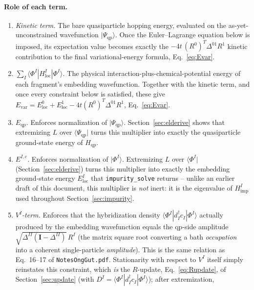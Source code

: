 \documentclass[11pt]{article}
\newcommand{\Hqp}{H_{\mathrm{qp}}}
\newcommand{\Himp}{H_{\mathrm{imp}}}
\newcommand{\Hloc}{H_{\mathrm{loc}}}
\begin{document}
\paragraph{Role of each term.}
\begin{enumerate}
  \item \emph{Kinetic term.} The bare quasiparticle hopping energy,
    evaluated on the as-yet-unconstrained wavefunction
    $|\Psi_{\mathrm{qp}}\rangle$. Once the Euler--Lagrange equation below is
    imposed, its expectation value becomes exactly the
    $-4t\,(R^0)^T\Delta^{01}R^1$ kinetic contribution to the final
    variational-energy formula, Eq.~\eqref{eq:Evar}.
  \item \emph{$\sum_I\langle\Phi^I|\Hloc^I|\Phi^I\rangle$.} The physical
    interaction-plus-chemical-potential energy of each fragment's embedding
    wavefunction. Together with the kinetic term, and once every constraint
    below is satisfied, these give
    $E_{\mathrm{var}}=E^0_{\mathrm{loc}}+E^1_{\mathrm{loc}}-4t(R^0)^T\Delta^{01}R^1$,
    Eq.~\eqref{eq:Evar}.
  \item \emph{$E_{\mathrm{qp}}$.} Enforces normalization of
    $|\Psi_{\mathrm{qp}}\rangle$. Section~\ref{sec:elderive} shows that
    extremizing $L$ over $\langle\Psi_{\mathrm{qp}}|$ turns this multiplier
    into exactly the quasiparticle ground-state energy of $\Hqp$.
  \item \emph{$E^{I,c}$.} Enforces normalization of $|\Phi^I\rangle$.
    Extremizing $L$ over $\langle\Phi^I|$ (Section~\ref{sec:elderive}) turns
    this multiplier into exactly the embedding ground-state energy
    $E^I_{\mathrm{loc}}$ that \texttt{impurity\_solve} returns -- unlike an
    earlier draft of this document, this multiplier is \emph{not} inert: it
    is the eigenvalue of $\Himp^I$ used throughout Section~\ref{sec:impurity}.
  \item \emph{$V^I$-term.} Enforces that the hybridization density
    $\langle\Phi^I|d^{\dagger}_Ic_I|\Phi^I\rangle$ actually produced by the
    embedding wavefunction equals the qp-side amplitude
    $\sqrt{\Delta^{II}(\mathbf{I}-\Delta^{II})}\,R^I$ (the matrix square root
    converting a bath \emph{occupation} into a coherent single-particle
    \emph{amplitude}). This is the same relation as Eq.~16--17 of
    \texttt{NotesOngGut.pdf}. Stationarity with respect to $V^I$ itself
    simply reinstates this constraint, which \emph{is} the $R$-update,
    Eq.~\eqref{eq:Rupdate}, of Section~\ref{sec:update} (with
    $D^I=\langle\Phi^I|d^{\dagger}_Ic_I|\Phi^I\rangle$); after extremization,

\end{enumerate}
\end{document}
